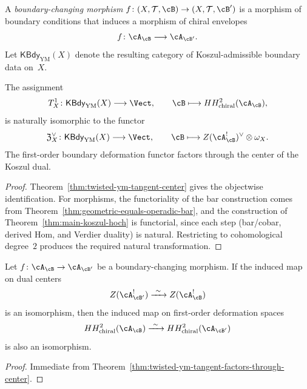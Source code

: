 \begin{definition}
\label{def:twisted-ym-boundary-morphism}
A \emph{boundary-changing morphism}
$f \colon (X,\mathcal{T},\cB) \to (X,\mathcal{T},\cB')$
is a morphism of boundary conditions that induces a morphism of chiral envelopes
\[
f \colon \cA_{\cB} \longrightarrow \cA_{\cB'}.
\]
Let $\mathsf{KBdy}_{\mathrm{YM}}(X)$ denote the resulting category of Koszul-admissible
boundary data on~$X$.
\end{definition}

\begin{theorem}
\label{thm:twisted-ym-tangent-factors-through-center}
The assignment
\[
T^1_X \colon \mathsf{KBdy}_{\mathrm{YM}}(X) \longrightarrow \Vect,
\qquad
\cB \longmapsto HH^2_{\mathrm{chiral}}(\cA_{\cB}),
\]
is naturally isomorphic to the functor
\[
\mathfrak{Z}^{\vee}_{X} \colon \mathsf{KBdy}_{\mathrm{YM}}(X) \longrightarrow \Vect,
\qquad
\cB \longmapsto Z(\cA_{\cB}^!)^{\vee} \otimes \omega_X.
\]
The first-order boundary deformation functor factors through the center of
the Koszul dual.
\end{theorem}

\begin{proof}
Theorem~\ref{thm:twisted-ym-tangent-center} gives the objectwise identification.
For morphisms, the functoriality of the bar construction comes from
Theorem~\ref{thm:geometric-equals-operadic-bar},
and the construction of Theorem~\ref{thm:main-koszul-hoch} is functorial, since each step (bar/cobar, derived $\mathrm{Hom}$, and Verdier duality) is natural. Restricting to
cohomological degree~$2$ produces the required natural transformation.
\end{proof}

\begin{corollary}
\label{cor:twisted-ym-interface-invariance}
Let $f \colon \cA_{\cB} \to \cA_{\cB'}$ be a boundary-changing morphism.
If the induced map on dual centers
\[
Z(\cA_{\cB'}^!) \xrightarrow{\ \sim\ } Z(\cA_{\cB}^!)
\]
is an isomorphism, then the induced map on first-order deformation spaces
\[
HH^2_{\mathrm{chiral}}(\cA_{\cB}) \xrightarrow{\ \sim\ } HH^2_{\mathrm{chiral}}(\cA_{\cB'})
\]
is also an isomorphism.
\end{corollary}

\begin{proof}
Immediate from Theorem~\ref{thm:twisted-ym-tangent-factors-through-center}.
\end{proof}


